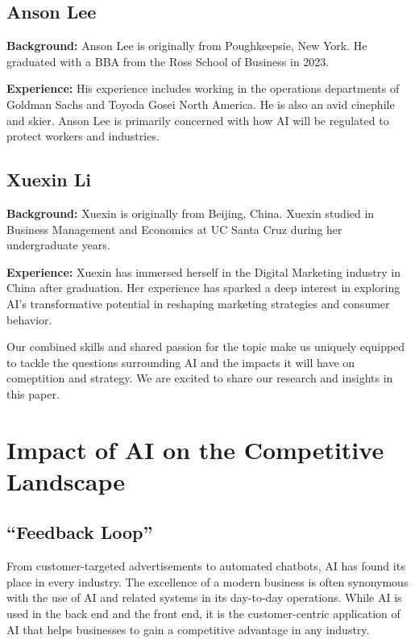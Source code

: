 \documentclass[
]{book}
\begin{document}
\hypertarget{anson-lee}{%
\section{Anson Lee}\label{anson-lee}}

\textbf{Background:}
Anson Lee is originally from Poughkeepsie, New York. He graduated with a BBA from the Ross School of Business in 2023.

\textbf{Experience:}
His experience includes working in the operations departments of Goldman Sachs and Toyoda Gosei North America. He is also an avid cinephile and skier. Anson Lee is primarily concerned with how AI will be regulated to protect workers and industries.

\hypertarget{xuexin-li}{%
\section{Xuexin Li}\label{xuexin-li}}

\textbf{Background:}
Xuexin is originally from Beijing, China. Xuexin studied in Business Management and Economics at UC Santa Cruz during her undergraduate years.

\textbf{Experience:} Xuexin has immersed herself in the Digital Marketing industry in China after graduation. Her experience has sparked a deep interest in exploring AI's transformative potential in reshaping marketing strategies and consumer behavior.

Our combined skills and shared passion for the topic make us uniquely equipped to tackle the questions surrounding AI and the impacts it will have on comeptition and strategy. We are excited to share our research and insights in this paper.

\hypertarget{impact-of-ai-on-the-competitive-landscape}{%
\chapter{Impact of AI on the Competitive Landscape}\label{impact-of-ai-on-the-competitive-landscape}}

\hypertarget{feedback-loop}{%
\section{``Feedback Loop''}\label{feedback-loop}}

From customer-targeted advertisements to automated chatbots, AI has found its place in every industry. The excellence of a modern business is often synonymous with the use of AI and related systems in its day-to-day operations. While AI is used in the back end and the front end, it is the customer-centric application of AI that helps businesses to gain a competitive advantage in any industry.
\end{document}
